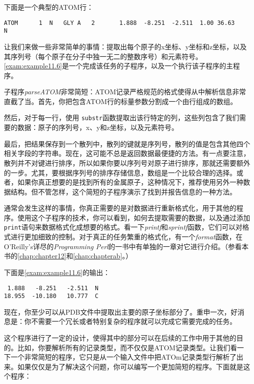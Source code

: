 下面是一个典型的ATOM行：

\begin{lstlisting}
ATOM      1  N   GLY A   2       1.888  -8.251  -2.511  1.00 36.63           N  
\end{lstlisting}

让我们来做一些非常简单的事情：提取出每个原子的x坐标、y坐标和z坐标，以及其序列号（每个原子在分子中独一无二的整数序号）和元素符号。\autoref{exam:example11.6}是一个完成该任务的子程序，以及一个执行该子程序的主程序。



子程序\textit{parseATOM}非常简短：ATOM记录严格规范的格式使得从中解析信息非常直截了当。首先，你把包含ATOM行的标量参数分割成一个由行组成的数组。

然后，对于每一行，使用 \verb|substr|函数提取出该行特定的列，这些列包含了我们需要的数据：原子的序列号，x、y和z坐标，以及元素符号。

最后，把结果保存到一个散列中，散列的键就是序列号，散列的值是包含其他四个相关字段的字符串。现在，这可能不总是返回数据最便捷的方法。有一点要注意，散列并不对键进行排序，所以如果你要以序列号对原子进行排序，那就还需要额外的一步。尤其，要根据序列号的排序存储信息，数组是一个比较合理的选择。或者，如果你真正想要的是找到所有的金属原子，这种情况下，推荐使用另外一种数据结构。但不管怎样，这个简短的子程序演示了找到并报告信息的一种方法。

通常会发生这样的事情，你真正需要的是对数据进行重新格式化，用于其他的程序。使用这个子程序的技术，你可以看到，如何去提取需要的数据，以及通过添加 \verb|print|语句来数据格式化成想要的格式。看一下\textit{printf}和\textit{sprintf}函数，它们可以对格式进行更加细致的控制。对于真正的任务繁重的格式化，有一个\textit{format}函数，在O'Reilly's详尽的\textit{Programming Perl}的一书中有单独的一章对它进行介绍。（参看本书的\autoref{chap:chapter12}和\autoref{chap:chapterab}。）

下面是\autoref{exam:example11.6}的输出：

\begin{lstlisting}
 1.888   -8.251   -2.511  N
18.955  -10.180   10.777  C
\end{lstlisting}

现在，你至少可以从PDB文件中提取出主要的原子坐标部分了。重申一次，好消息是：你不需要一个冗长或者特别复杂的程序就可以完成它需要完成的任务。

这个程序进行了一定的设计，使得其中的部分可以在后续的工作中用于其他的目的。比如，你要解析所有的记录类型，而不仅仅是ATOM记录类型。让我们看一下一个非常简短的程序，它只是从一个输入文件中把ATOm记录类型行解析了出来。如果仅仅是为了解决这个问题，你可以编写一个更加简短的程序。下面就是这个程序：

